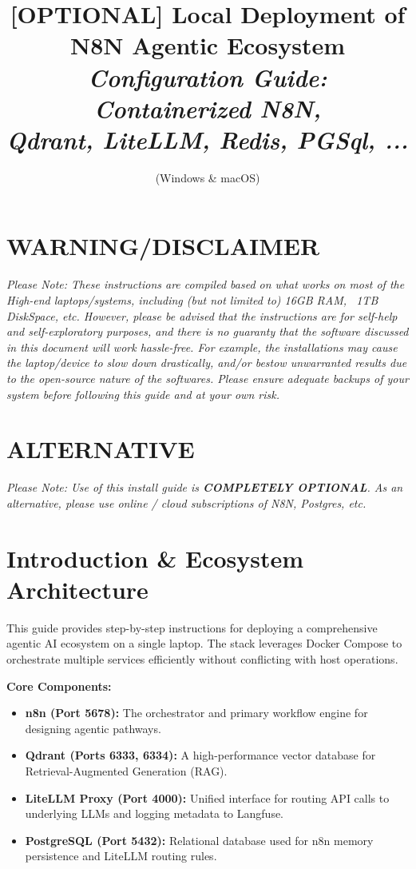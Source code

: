 \documentclass[12pt,a4paper]{article}
\title{\textbf{ [OPTIONAL] Local Deployment of N8N Agentic Ecosystem}\\ 
\large \textit{Configuration Guide: Containerized N8N, \\ 
Qdrant, LiteLLM, Redis, PGSql, ...} }
\author{(Windows \& macOS)}
\begin{document}
\maketitle

\section*{WARNING/DISCLAIMER}
\textit{Please Note: These instructions are compiled based on what works on most of the High-end laptops/systems, including (but not limited to) 16GB RAM, ~1TB DiskSpace, etc. However, please be advised that the instructions are for self-help and self-exploratory purposes, and there is no guaranty that the software discussed in this document will work hassle-free. For example, the installations may cause the laptop/device to slow down drastically, and/or bestow unwarranted results due to the open-source nature of the softwares. Please ensure adequate backups of your system before following this guide and at your own risk.}

\section*{ALTERNATIVE}
\textit{Please Note: Use of this install guide is \textbf{COMPLETELY OPTIONAL}. As an alternative, please use online / cloud subscriptions of N8N, Postgres, etc. }

\tableofcontents
\newpage

\section{Introduction \& Ecosystem Architecture}
This guide provides step-by-step instructions for deploying a comprehensive agentic AI ecosystem on a single laptop. The stack leverages Docker Compose to orchestrate multiple services efficiently without conflicting with host operations.

\textbf{Core Components:}
\begin{itemize}
    \item \textbf{n8n (Port 5678):} The orchestrator and primary workflow engine for designing agentic pathways.
    \item \textbf{Qdrant (Ports 6333, 6334):} A high-performance vector database for Retrieval-Augmented Generation (RAG).
    \item \textbf{LiteLLM Proxy (Port 4000):} Unified interface for routing API calls to underlying LLMs and logging metadata to Langfuse.
    \item \textbf{PostgreSQL (Port 5432):} Relational database used for n8n memory persistence and LiteLLM routing rules.
\end{itemize}
\end{document}
